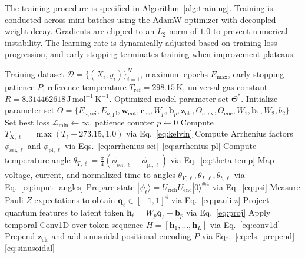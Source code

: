 \documentclass[a4paper,fleqn]{cas-sc}
\begin{document}
The training procedure is specified in Algorithm~\ref{alg:training}. Training is conducted across mini-batches using the AdamW optimizer with decoupled weight decay. Gradients are clipped to an $L_2$ norm of $1.0$ to prevent numerical instability. The learning rate is dynamically adjusted based on training loss progression, and early stopping terminates training when improvement plateaus.

\begin{algorithm}[t]
\caption{End-to-End Training of TE-Q-Transformer}\label{alg:training}
\begin{algorithmic}[1]
\Require Training dataset $\mathcal{D} = \{(X_i, y_i)\}_{i=1}^N$, maximum epochs $E_{\max}$, early stopping patience $P$, reference temperature $T_{\mathrm{ref}} = 298.15\,\mathrm{K}$, universal gas constant $R = 8.314462618\,\mathrm{J\,mol^{-1}\,K^{-1}}$.
\Ensure Optimized model parameter set $\Theta^*$.
\State Initialize parameter set $\Theta = \{E_{a,\mathrm{sei}}, E_{a,\mathrm{pl}}, \mathbf{w}_{\mathrm{ent}}, \mathbf{r}_{zz}, W_p, \mathbf{b}_p, \mathbf{z}_{\mathrm{cls}}, \Theta_{\mathrm{conv}}, \Theta_{\mathrm{enc}}, W_1, \mathbf{b}_1, W_2, b_2\}$
\State Set best loss $\mathcal{L}_{\min} \gets \infty$, patience counter $p \gets 0$
            \State Compute $T_{K,\ell} = \max(T_\ell + 273.15, 1.0)$ via Eq.~\eqref{eq:kelvin}
            \State Compute Arrhenius factors $\phi_{\mathrm{sei},\ell}$ and $\phi_{\mathrm{pl},\ell}$ via Eqs.~\eqref{eq:arrhenius-sei}--\eqref{eq:arrhenius-pl}
            \State Compute temperature angle $\theta_{T,\ell} = \frac{\pi}{4}(\phi_{\mathrm{sei},\ell} + \phi_{\mathrm{pl},\ell})$ via Eq.~\eqref{eq:theta-temp}
            \State Map voltage, current, and normalized time to angles $\theta_{V,\ell}, \theta_{I,\ell}, \theta_{t,\ell}$ via Eq.~\eqref{eq:input_angles}
            \State Prepare state $|\psi_\ell\rangle = U_{\mathrm{rich}} U_{\mathrm{enc}}|0\rangle^{\otimes 4}$ via Eq.~\eqref{eq:psi}
            \State Measure Pauli-$Z$ expectations to obtain $\mathbf{q}_\ell \in [-1, 1]^4$ via Eq.~\eqref{eq:pauli-z}
            \State Project quantum features to latent token $\mathbf{h}_\ell = W_p \mathbf{q}_\ell + \mathbf{b}_p$ via Eq.~\eqref{eq:proj}
        \EndFor
        \State Apply temporal Conv1D over token sequence $H = [\mathbf{h}_1, \dots, \mathbf{h}_L]$ via Eq.~\eqref{eq:conv1d}
        \State Prepend $\mathbf{z}_{\mathrm{cls}}$ and add sinusoidal positional encoding $P$ via Eqs.~\eqref{eq:cls_prepend}--\eqref{eq:sinusoidal}

\end{algorithmic}
\end{algorithm}
\end{document}
